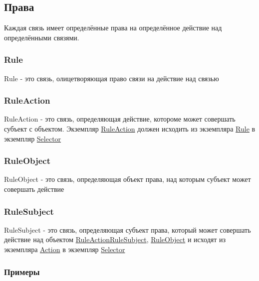 \subsection{Права}
Каждая связь имеет определённые права на определённое действие над определёнными связями. \
\subsubsection{Rule}\hypertarget{Rule.Description}{}
Rule - это связь, олицетворяющая право связи на действие над связью
\subsubsection{RuleAction}\hypertarget{RuleAction.Description}{}
RuleAction - это связь, определяющая действие, котороме может совершать субъект с объектом. Экземпляр \hyperlink{RuleAction.Description}{RuleAction} должен исходить из экземпляра \hyperlink{Rule.Description}{Rule} в экземпляр \hyperlink{Selector.Description}{Selector}
\subsubsection{RuleObject}\hypertarget{RuleObject.Description}{}
RuleObject - это связь, определяющая объект права, над которым субъект может совершать действие
\subsubsection{RuleSubject}\hypertarget{RuleSubject.Description}{}
RuleSubject - это связь, определяющая субъект права, который может совершать действие над объектом
\hyperlink{RuleAction.Description}{RuleAction}\hyperlink{RuleSubject.Description}{RuleSubject}, \hyperlink{RuleObject.Description}{RuleObject} и  исходят из экземпляра \hyperlink{Core.Action.Description}{Action} в экземпляр \hyperlink{Selector.Description}{Selector}
\subsubsection{Примеры}
